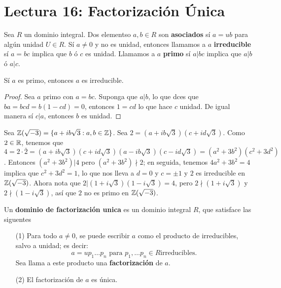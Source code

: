 \section*{Lectura 16: Factorizaci\'on \'Unica}

\begin{definition}
    Sea $R$ un dominio integral. Dos elementso  $a,b \in R$ son
    \textbf{asociados} s\'i $a=ub$ para alg\'un unidad  $U \in R$. S\'i  $a \neq
    0$ y no es unidad, entonces llamamos a $a$ \textbf{irreducible} s\'i $a=bc$
    implica que $b$ \'o $c$ es unidad. Llamamos a $a$ \textbf{primo} s\'i $a|bc$
    implica que $a|b$ \'o  $a|c$.
\end{definition}

\begin{lemma}\label{16.67}
    S\'i $a$ es primo, entonces $a$ es irreducible.
\end{lemma}
\begin{proof}
    Sea $a$ primo con $a=bc$. Suponga que  $a|b$, lo que dces que
    $ba=bcd=b(1-cd)=0$, entonces $1=cd$ lo que hace  $c$ unidad. De igual manera
    s\'i  $c|a$, entonces $b$ es unidad.
\end{proof}

\begin{example}\label{}
    Sea $\mathbb{Z}(\sqrt{-3})=\{a+ib\sqrt{3} : a,b \in \mathbb{Z}\}$. Sea
    $2=(a+ib\sqrt{3})(c+id\sqrt{3})$. Como $2 \in \mathbb{R}$, tenemos que  $4=2 \cdot
    \bar{2}=(a+ib\sqrt{3})(c+id\sqrt{3})(a-ib\sqrt{3})(c-id\sqrt{3})=(a^2+3b^2)
    (c^2+3d^2)$. Entonces $(a^2+3b^2)|4$ pero $(a^2+3b^2) \nmid 2$; en seguida,
    tenemos $4a^2+3b^2=4$ implica que  $c^2+3d^2=1$, lo que nos lleva a $d=0$ y
    $c=\pm 1$ y $2$ es irreducible en  $\mathbb{Z}(\sqrt{-3})$. Ahora nota que
    $2|(1+i\sqrt{3})(1-i\sqrt{3})=4$, pero $2 \nmid (1+i\sqrt{3})$ y $2 \nmid
    (1-i\sqrt{3})$, as\'i que $2$ no es primo en  $\mathbb{Z}(\sqrt{-3})$.
\end{example}

\begin{definition}
    Un \textbf{dominio de factorizaci\'on unica} es un dominio integral $R$, que
    satisface las siguentes
    \begin{enumerate}
        \item[(1)] Para todo $a \neq 0$, se puede escribir $a$ como el producto
            de irreducibles, salvo a unidad; es decir:
            \begin{equation*}
                a=up_1 \dots p_n \text{ para } p_1, \dots p_n \in R \text{
                irreducibles.}
            \end{equation*}
            Sea llama a este producto una \textbf{factorizaci\'on} de $a$.

        \item[(2)] El factorizaci\'on de $a$ es \'unica.
    \end{enumerate}
\end{definition}

